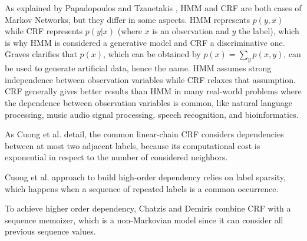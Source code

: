 \begin{enumerate}[listparindent=\parindent,itemindent=\parindent,label=\textbf{RQ\arabic*.}]
    As explained by Papadopoulos and Tzanetakis \cite{papadopoulos_models_2017}, HMM and CRF are both cases of Markov Networks, but they differ in some aspects.
        HMM represents $p(y,x)$ while CRF represents $p(y|x)$ (where $x$ is an observation and $y$ the label), which is why HMM is considered a generative model and CRF a discriminative one.
        Graves \cite{graves_supervised_2012} clarifies that $p(x)$, which can be obtained by $p(x) = \sum_{y} p(x,y)$, can be used to generate artificial data, hence the name.
        HMM assumes strong independence between observation variables while CRF relaxes that assumption.
        CRF generally gives better results than HMM in many real-world problems where the dependence between observation variables is common, like natural language processing, music audio signal processing, speech recognition, and bioinformatics.
        
    
    
    As Cuong et al. \cite{cuong_conditional_2014} detail, the common linear-chain CRF considers dependencies between at most two adjacent labels, because its computational cost is exponential in respect to the number of considered neighbors.
    
    Cuong et al. \cite{cuong_conditional_2014} approach to build high-order dependency relies on label sparsity, which happens when a sequence of repeated labels is a common occurrence.
    
    To achieve higher order dependency, Chatzis and Demiris \cite{chatzis_infinite-order_2013} combine CRF with a sequence memoizer, which is a non-Markovian model since it can consider all previous sequence values.
    
    
    
    

\end{enumerate}
